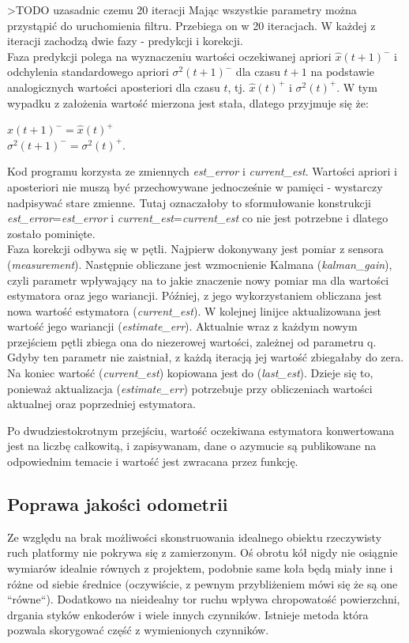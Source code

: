 >TODO uzasadnic czemu 20 iteracji
Mając wszystkie parametry można przystąpić do uruchomienia filtru. Przebiega on w 20 iteracjach. W każdej z iteracji zachodzą dwie fazy - predykcji i korekcji.
\\

Faza predykcji polega na wyznaczeniu wartości oczekiwanej apriori $\hat{x}(t+1)^-$ i odchylenia standardowego apriori $\sigma^2(t+1)^-$ dla czasu $t+1$ na podstawie analogicznych wartości aposteriori dla czasu $t$, tj.  $\hat{x}(t)^+$ i $\sigma^2(t)^+$. W tym wypadku z założenia wartość mierzona jest stała, dlatego przyjmuje się że:
\begin{center}
    $\hat{x}(t+1)^- = \hat{x}(t)^+$ \\[5pt]
    $\sigma^2(t+1)^- = \sigma^2(t)^+$.    
\end{center}
Kod programu korzysta ze zmiennych \emph{est\_error} i \emph{current\_est}. Wartości apriori i aposteriori nie muszą być przechowywane jednocześnie w pamięci - wystarczy nadpisywać stare zmienne. Tutaj oznaczałoby to sformułowanie konstrukcji \emph{est\_error}=\emph{est\_error} i \emph{current\_est}=\emph{current\_est} co nie jest potrzebne i dlatego zostało pominięte.
\\

Faza korekcji odbywa się w pętli. Najpierw dokonywany jest pomiar z sensora (\emph{measurement}). Następnie obliczane jest wzmocnienie Kalmana (\emph{kalman\_gain}), czyli parametr wpływający na to jakie znaczenie nowy pomiar ma dla wartości estymatora oraz jego wariancji. Później, z jego wykorzystaniem obliczana jest nowa wartość estymatora (\emph{current\_est}). W kolejnej linijce aktualizowana jest wartość jego wariancji (\emph{estimate\_err}). Aktualnie wraz z każdym nowym przejściem pętli zbiega ona do niezerowej wartości, zależnej od parametru q. Gdyby ten parametr nie zaistniał, z każdą iteracją jej wartość zbiegałaby do zera. Na koniec wartość (\emph{current\_est}) kopiowana jest do (\emph{last\_est}). Dzieje się to, ponieważ aktualizacja (\emph{estimate\_err}) potrzebuje przy obliczeniach wartości aktualnej oraz poprzedniej estymatora.

Po dwudziestokrotnym przejściu, wartość oczekiwana estymatora konwertowana jest na liczbę całkowitą, i zapisywanam, dane o azymucie są publikowane na odpowiednim temacie i wartość jest zwracana przez funkcję.

\subsection{Poprawa jakości odometrii}
Ze względu na brak możliwości skonstruowania idealnego obiektu rzeczywisty ruch platformy nie pokrywa się z zamierzonym. Oś obrotu kół nigdy nie osiągnie wymiarów idealnie równych z projektem, podobnie same koła będą miały inne i różne od siebie średnice (oczywiście, z pewnym przybliżeniem mówi się że są one ``równe``). Dodatkowo na nieidealny tor ruchu wpływa chropowatość powierzchni, drgania styków enkoderów i wiele innych czynników. Istnieje metoda która pozwala skorygować część z wymienionych czynników.
\\

